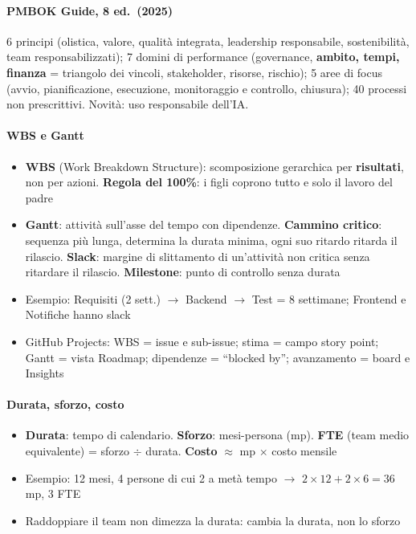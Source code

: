 \documentclass[12pt]{extarticle}
\begin{document}
\paragraph{PMBOK Guide, 8\textordfeminine{} ed.\ (2025)} 6 principi (olistica, valore, qualità integrata, leadership responsabile, sostenibilità, team responsabilizzati); 7 domini di performance (governance, \textbf{ambito, tempi, finanza} = triangolo dei vincoli, stakeholder, risorse, rischio); 5 aree di focus (avvio, pianificazione, esecuzione, monitoraggio e controllo, chiusura); 40 processi non prescrittivi. Novità: uso responsabile dell'IA.

\paragraph{WBS e Gantt}
\begin{itemize}
    \item \textbf{WBS} (Work Breakdown Structure): scomposizione gerarchica per \textbf{risultati}, non per azioni. \textbf{Regola del 100\%}: i figli coprono tutto e solo il lavoro del padre
    \item \textbf{Gantt}: attività sull'asse del tempo con dipendenze. \textbf{Cammino critico}: sequenza più lunga, determina la durata minima, ogni suo ritardo ritarda il rilascio. \textbf{Slack}: margine di slittamento di un'attività non critica senza ritardare il rilascio. \textbf{Milestone}: punto di controllo senza durata
    \item Esempio: Requisiti (2 sett.) $\rightarrow$ Backend $\rightarrow$ Test = 8 settimane; Frontend e Notifiche hanno slack
    \item GitHub Projects: WBS = issue e sub-issue; stima = campo story point; Gantt = vista Roadmap; dipendenze = ``blocked by''; avanzamento = board e Insights
\end{itemize}

\paragraph{Durata, sforzo, costo}
\begin{itemize}
    \item \textbf{Durata}: tempo di calendario. \textbf{Sforzo}: mesi-persona (mp). \textbf{FTE} (team medio equivalente) = sforzo $\div$ durata. \textbf{Costo} $\approx$ mp $\times$ costo mensile
    \item Esempio: 12 mesi, 4 persone di cui 2 a metà tempo $\rightarrow$ $2\times12+2\times6=36$ mp, 3 FTE
    \item Raddoppiare il team non dimezza la durata: cambia la durata, non lo sforzo
\end{itemize}
\end{document}
